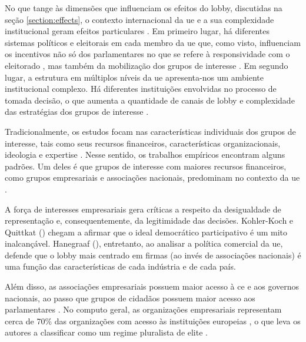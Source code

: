 No que tange às dimensões que influenciam os efeitos do lobby, discutidas na seção \ref{section:effects}, o contexto internacional da \acrshort{ue} e a sua complexidade institucional geram efeitos particulares \cite{kluver2015legislative}. Em primeiro lugar, há diferentes sistemas políticos e eleitorais em cada membro da \acrshort{ue} que, como visto, influenciam os incentivos não só dos parlamentares no que se refere à responsividade com o eleitorado \cite{mahoney_lobbying_2007}, mas também da mobilização dos grupos de interesse \cite{kluver2015legislative}. Em segundo lugar, a estrutura em múltiplos níveis da \acrshort{ue} apresenta-nos um ambiente institucional complexo. Há diferentes instituições envolvidas no processo de tomada decisão, o que aumenta a quantidade de canais de lobby e complexidade das estratégias dos grupos de interesse \cite{richardson2000government,eising2007institutional, coen2019legislative}. 

Tradicionalmente, os estudos focam nas características individuais dos grupos de interesse, tais como seus recursos financeiros, características organizacionais, ideologia e expertise \cite{Bouwen2002, dur2007question, eising2007institutional}. Nesse sentido, os trabalhos empíricos encontram alguns padrões. Um deles é que grupos de interesse com maiores recursos financeiros, como grupos empresariais e associações nacionais, predominam no contexto da \acrshort{ue} \cite{dur20212wholobbies, eising2007institutional}.

    A força de interesses empresariais gera críticas a respeito da desigualdade de representação e, consequentemente, da legitimidade das decisões. Kohler-Koch e Quittkat (\citeyear{kohler2007desmyth}) chegam a afirmar que o ideal democrático participativo é um mito inalcançável. Hanegraaf (\citeyear{Hanegraaff2024firms}), entretanto, ao analisar a política comercial da \acrshort{ue}, defende que o lobby mais centrado em firmas (ao invés de associações nacionais) é uma função das características de cada indústria e de cada país.

    Além disso, as associações empresariais possuem maior acesso à \acrshort{ce} \cite{gornitzka2015} e aos governos nacionais, ao passo que grupos de cidadãos possuem maior acesso aos parlamentares \cite{dur20212wholobbies}. No computo geral, as organizações empresariais representam cerca de 70\% das organizações com acesso às instituições europeias \cite{Coen2007}, o que leva os autores a classificar como um regime pluralista de elite \cite{coen1997evolution, coen1998european, Bouwen2002, schmidt2006procedural}. 

